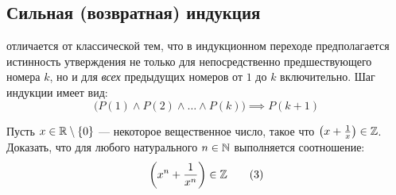 \subsection{Сильная (возвратная) индукция}

\begin{definition}
    отличается от классической тем, что в индукционном переходе 
    предполагается истинность утверждения не только для непосредственно 
    предшествующего номера $k$, но и для \emph{всех} предыдущих номеров 
    от $1$ до $k$ включительно. Шаг индукции имеет вид:
    \begin{equation} \label{eq:strong_ind}
        \bigl(P(1) \land P(2) \land \dots \land P(k)\bigr) \implies P(k + 1) 
        \tag{2}
    \end{equation}
\end{definition}

\begin{problem}
    Пусть $x \in \mathbb{R} \setminus \{0\}$ --- некоторое вещественное число, 
    такое что $\left(x + \frac{1}{x}\right) \in \mathbb{Z}$. Доказать, что для 
    любого натурального $n \in \mathbb{N}$ выполняется соотношение:
    \begin{equation} \label{eq:x_inv_n}
        \left(x^n + \frac{1}{x^n}\right) \in \mathbb{Z} \tag{3}
    \end{equation}
\end{problem}

